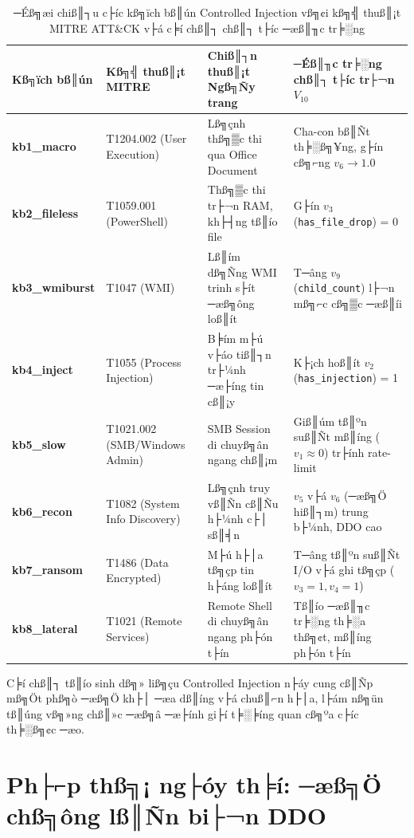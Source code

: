 ﻿\documentclass[../main.tex]{subfiles}
\begin{document}
\begin{table}[H]
\centering
\small
\setlength{\tabcolsep}{4pt}
\caption{─Éß╗æi chiß║┐u c├íc kß╗ïch bß║ún Controlled Injection vß╗¢i kß╗╣ thuß║¡t MITRE ATT\&CK v├á c╞í chß║┐ chß║┐ t├íc ─æß║╖c tr╞░ng}
\label{tab:controlled_injection_scenarios}
\begin{tabular}{|p{2.2cm}|p{3.5cm}|p{3.0cm}|p{4.5cm}|}
\hline
\textbf{Kß╗ïch bß║ún} & \textbf{Kß╗╣ thuß║¡t MITRE} & \textbf{Chiß║┐n thuß║¡t Ngß╗Ñy trang} & \textbf{─Éß║╖c tr╞░ng chß║┐ t├íc tr├¬n $V_{10}$} \\ \hline
\textbf{kb1\_macro} & T1204.002 (User Execution) & Lß╗çnh thß╗▒c thi qua Office Document & Cha-con bß║Ñt th╞░ß╗¥ng, g├ín cß╗⌐ng $v_6 \to 1.0$ \\ \hline
\textbf{kb2\_fileless} & T1059.001 (PowerShell) & Thß╗▒c thi tr├¬n RAM, kh├┤ng tß║ío file & G├ín $v_3$ (\texttt{has\_file\_drop}) = 0 \\ \hline
\textbf{kb3\_wmiburst} & T1047 (WMI) & Lß║ím dß╗Ñng WMI trinh s├ít ─æß╗ông loß║ít & T─âng $v_9$ (\texttt{child\_count}) l├¬n mß╗⌐c cß╗▒c ─æß║íi \\ \hline
\textbf{kb4\_inject} & T1055 (Process Injection) & B╞ím m├ú v├áo tiß║┐n tr├¼nh ─æ├íng tin cß║¡y & K├¡ch hoß║ít $v_2$ (\texttt{has\_injection}) = 1 \\ \hline
\textbf{kb5\_slow} & T1021.002 (SMB/Windows Admin) & SMB Session di chuyß╗ân ngang chß║¡m & Giß║úm tß║ºn suß║Ñt mß║íng ($v_1 \approx 0$) tr├ính rate-limit \\ \hline
\textbf{kb6\_recon} & T1082 (System Info Discovery) & Lß╗çnh truy vß║Ñn cß║Ñu h├¼nh c├│ sß║╡n & $v_5$ v├á $v_6$ (─æß╗Ö hiß║┐m) trung b├¼nh, DDO cao \\ \hline
\textbf{kb7\_ransom} & T1486 (Data Encrypted) & M├ú h├│a tß╗çp tin h├áng loß║ít & T─âng tß║ºn suß║Ñt I/O v├á ghi tß╗çp ($v_3 = 1, v_4 = 1$) \\ \hline
\textbf{kb8\_lateral} & T1021 (Remote Services) & Remote Shell di chuyß╗ân ngang ph├ón t├ín & Tß║ío ─æß║╖c tr╞░ng th╞░a thß╗¢t, mß║íng ph├ón t├ín \\ \hline
\end{tabular}
\end{table}

C╞í chß║┐ tß║ío sinh dß╗» liß╗çu Controlled Injection n├áy cung cß║Ñp mß╗Öt phß╗ò ─æß╗Ö kh├│ ─æa dß║íng v├á chuß║⌐n h├│a, l├ám nß╗ün tß║úng vß╗»ng chß║»c ─æß╗â ─æ├ính gi├í t╞░╞íng quan cß╗ºa c├íc th╞░ß╗¢c ─æo.

\section{Ph├⌐p thß╗¡ ng├óy th╞í: ─æß╗Ö chß╗ông lß║Ñn bi├¬n DDO}
\label{section:2.4}
\end{document}
